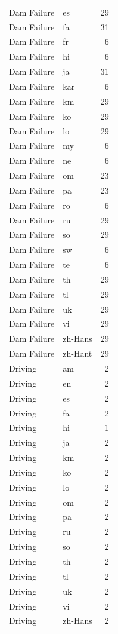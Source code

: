 \begin{longtable}{p{3cm} p{3cm} r}
Dam Failure & es & 29 \\
Dam Failure & fa & 31 \\
Dam Failure & fr & 6 \\
Dam Failure & hi & 6 \\
Dam Failure & ja & 31 \\
Dam Failure & kar & 6 \\
Dam Failure & km & 29 \\
Dam Failure & ko & 29 \\
Dam Failure & lo & 29 \\
Dam Failure & my & 6 \\
Dam Failure & ne & 6 \\
Dam Failure & om & 23 \\
Dam Failure & pa & 23 \\
Dam Failure & ro & 6 \\
Dam Failure & ru & 29 \\
Dam Failure & so & 29 \\
Dam Failure & sw & 6 \\
Dam Failure & te & 6 \\
Dam Failure & th & 29 \\
Dam Failure & tl & 29 \\
Dam Failure & uk & 29 \\
Dam Failure & vi & 29 \\
Dam Failure & zh-Hans & 29 \\
Dam Failure & zh-Hant & 29 \\
Driving & am & 2 \\
Driving & en & 2 \\
Driving & es & 2 \\
Driving & fa & 2 \\
Driving & hi & 1 \\
Driving & ja & 2 \\
Driving & km & 2 \\
Driving & ko & 2 \\
Driving & lo & 2 \\
Driving & om & 2 \\
Driving & pa & 2 \\
Driving & ru & 2 \\
Driving & so & 2 \\
Driving & th & 2 \\
Driving & tl & 2 \\
Driving & uk & 2 \\
Driving & vi & 2 \\
Driving & zh-Hans & 2 \\

\end{longtable}
